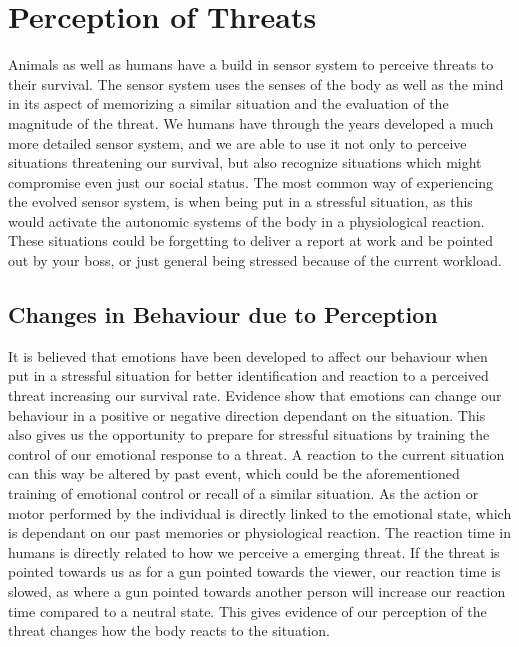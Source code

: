 \section{Perception of Threats} \label{perception}
Animals as well as humans have a build in sensor system to perceive threats to their survival. The sensor system uses the senses of the body as well as the mind in its aspect of memorizing a similar situation and the evaluation of the magnitude of the threat. We humans have through the years developed a much more detailed sensor system, and we are able to use it not only to perceive situations threatening our survival, but also recognize situations which might compromise even just our social status. The most common way of experiencing the evolved sensor system, is when being put in a stressful situation, as this would activate the autonomic systems of the body in a physiological reaction. These situations could be forgetting to deliver a report at work and be pointed out by your boss, or just general being stressed because of the current workload.

\subsection{Changes in Behaviour due to Perception}
It is believed that emotions have been developed to affect our behaviour when put in a stressful situation for better identification and reaction to a perceived threat increasing our survival rate. Evidence show that emotions can change our behaviour in a positive or negative direction dependant on the situation. This also gives us the opportunity to prepare for stressful situations by training the control of our emotional response to a threat. A reaction to the current situation can this way be altered by past event, which could be the aforementioned training of emotional control or recall of a similar situation. As the action or motor performed by the individual is directly linked to the emotional state, which is dependant on our past memories or physiological reaction. The reaction time in humans is directly related to how we perceive a emerging threat. If the threat is pointed towards us as for a gun pointed towards the viewer, our reaction time is slowed, as where a gun pointed towards another person will increase our reaction time compared to a neutral state. This gives evidence of our perception of the threat changes how the body reacts to the situation. 

